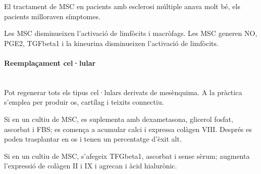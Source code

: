 El tractament de MSC en pacients amb esclerosi múltiple anava molt bé,
els pacients milloraven símptomes. 

Les MSC disminueixen l'activació de
limfòcits i macròfags. Les MSC generen NO, PGE2, TGFbeta1 i la
kineurina disminueixen l'activació de limfòcits.

\paragraph{Reemplaçament cel·lular} \hfill \\
Pot regenerar tots els tipus cel·lulars derivats de mesènquima. A la
pràctica s'emplea per produir os, cartílag i teixits connectiu.

Si en un cultiu de MSC, es suplementa amb dexametasona, glicerol
fosfat, ascorbat i FBS; es comença a acumular calci i expressa colàgen
VIII. Després es poden trasplantar en os i tenen un percentatge d'èxit
alt.

Si en un cultiu de MSC, s'afegeix TFGbeta1, ascorbat i sense sèrum;
augmenta l'expressió de colàgen II i IX i agrecan i àcid hialurònic.